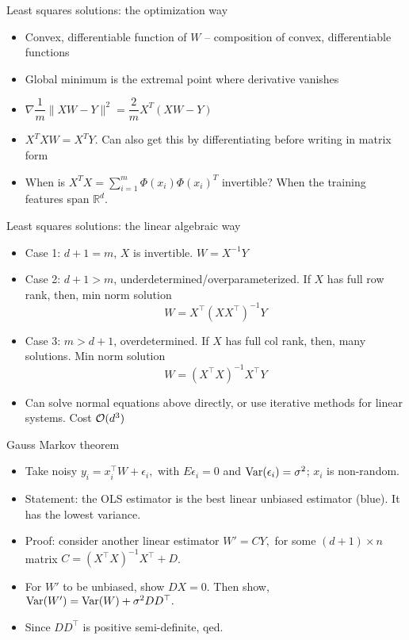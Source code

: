 \documentclass[final]{beamer}
\begin{document}
\begin{frame}{Least squares solutions: the optimization way}
	\begin{itemize}
		\item Convex, differentiable function of $W$ -- composition of convex, differentiable functions
		\pause
		\item Global minimum is the extremal point where derivative vanishes
		\pause
		\item $\nabla \dfrac{1}{m}\|X W - Y\|^2 = \dfrac{2}{m} X^T(XW - Y)$
		\pause
		\item $X^T X W = X^T Y$. Can also get this by differentiating before writing in matrix form
		\pause
		\item When is $X^T X = \sum_{i=1}^m \Phi(x_i) \Phi(x_i)^T$ invertible? When the training features span $\mathbb{R}^d$.  
	\end{itemize}
\end{frame}
\begin{frame}{Least squares solutions: the linear algebraic way}
	\begin{itemize}
		\item Case 1: $d+1 = m$, $X$ is invertible. $W = X^{-1} Y$
		\pause 
	\item Case 2: $d+1 > m$, underdetermined/overparameterized. If $X$ has full row rank, then, min norm solution	$$ W = X^\top (X X^\top)^{-1} Y$$
\pause
	\item Case 3: $m > d+1$, overdetermined. If $X$ has full col rank, then, many solutions. Min norm solution $$ W = (X^\top X)^{-1} X^\top Y$$
	\pause
\item Can solve normal equations above directly, or use iterative methods for linear systems. Cost ${\cal O}(d^3)$ 
\end{itemize}
\end{frame}
\begin{frame}{Gauss Markov theorem}
	\begin{itemize}
		\item Take noisy $y_i = x_i^\top W  + \epsilon_i,$ with $E\epsilon_i = 0$ and ${\rm Var}(\epsilon_i) = \sigma^2$; $x_i$ is non-random.
		\pause
		\item Statement: the OLS estimator is the best linear unbiased estimator (blue). It has the lowest variance.
		\pause
	\item Proof: consider another linear estimator $W' = C Y,$ for some $(d+1)\times n$ matrix $C =  (X^\top X)^{-1} X^\top + D$. 
	\pause 
	\item For $W'$ to be unbiased, show $DX = 0$. Then show, ${\rm Var}(W') = {\rm Var}(W) + \sigma^2 DD^\top.$
	\pause
	\item Since $DD^\top$ is positive semi-definite, qed.
	\end{itemize}
\end{frame}
\end{document}
